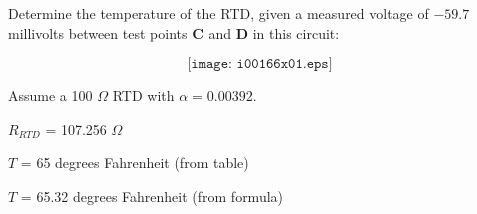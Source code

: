 

Determine the temperature of the RTD, given a measured voltage of $-59.7$ millivolts between test points {\bf C} and {\bf D} in this circuit:

$$\texttt{[image: i00166x01.eps]}$$

Assume a 100 $\Omega$ RTD with $\alpha = 0.00392$.







$R_{RTD}$ = 107.256 $\Omega$

\vskip 10pt

$T$ = 65 degrees Fahrenheit (from table)

\vskip 10pt

$T$ = 65.32 degrees Fahrenheit (from formula)










